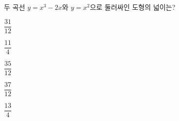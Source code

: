 두 곡선 $y=x^3-2x$와 $y=x^2$으로 둘러싸인 도형의 넓이는?
\begin{choices32}{\rule[-3ex]{0pt}{8ex}$\dfrac{31}{12}$}{\rule[-3ex]{0pt}{8ex}$\dfrac{11}{4}$}{\rule[-3ex]{0pt}{8ex}$\dfrac{35}{12}$}{\rule[-3ex]{0pt}{8ex}$\dfrac{37}{12}$}{\rule[-3ex]{0pt}{8ex}$\dfrac{13}{4}$}\end{choices32}
